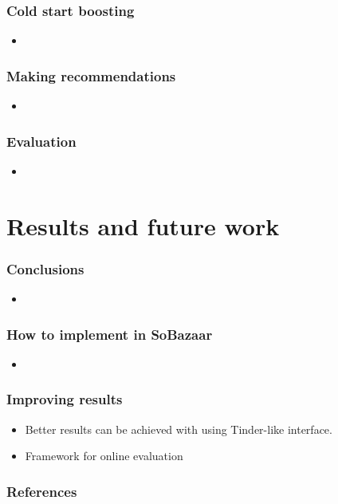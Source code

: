 \documentclass{beamer}
\begin{document}
  \begin{frame}
    \frametitle{Cold start boosting}
    \begin{itemize}
      \item
    \end{itemize}
  \end{frame}

  \begin{frame}
    \frametitle{Making recommendations}
    \begin{itemize}
      \item
    \end{itemize}
  \end{frame}

  \begin{frame}
    \frametitle{Evaluation}
    \begin{itemize}
      \item
    \end{itemize}
  \end{frame}

  \section{Results and future work}

  \begin{frame}
    \frametitle{Conclusions}
    \begin{itemize}
      \item
    \end{itemize}
  \end{frame}

  \begin{frame}
    \frametitle{How to implement in SoBazaar}
    \begin{itemize}
      \item
    \end{itemize}
  \end{frame}

  \begin{frame}
    \frametitle{Improving results}
    \begin{itemize}
      \item Better results can be achieved with using Tinder-like interface.
      \item Framework for online evaluation
    \end{itemize}
  \end{frame}

  \begin{frame}[allowframebreaks]
    \frametitle{References}
    
    
  \end{frame}
\end{document}
